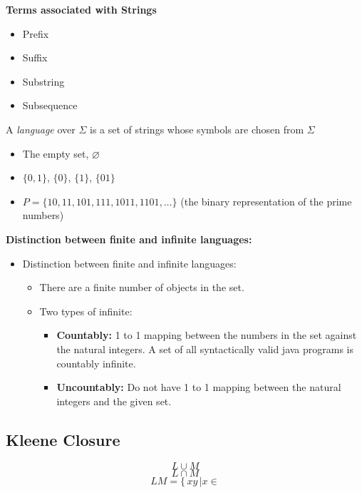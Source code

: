 \documentclass[]{article}
\begin{document}
  \textbf{Terms associated with Strings}
  \begin{itemize}
    \item Prefix
    \item Suffix
    \item Substring
    \item Subsequence
  \end{itemize}

  A \emph{language} over $\Sigma$ is a set of strings whose symbols are chosen 
  from $\Sigma$
  \begin{example}
    \begin{itemize}
      \item The empty set, $\varnothing$
      \item $\{ 0, 1 \}$, $\{0\}$, $\{1\}$, $\{01\}$
      \item $P = \{ 10, 11, 101, 111, 1011, 1101, \ldots \}$ (the binary 
      representation of the prime numbers)
    \end{itemize}
  \end{example}

  \textbf{Distinction between finite and infinite languages:}
    \begin{itemize}
      \item Distinction between finite and infinite languages:
      \begin{itemize}
        \item There are a finite number of objects in the set.
        \item Two types of infinite:
        \begin{itemize}
          \item \textbf{Countably:} 1 to 1 mapping between the numbers in the 
          set against the natural integers. A set of all syntactically valid 
          java programs is countably infinite.
          \item \textbf{Uncountably:} Do not have 1 to 1 mapping between the 
          natural integers and the given set.
        \end{itemize}
      \end{itemize}
    \end{itemize}

  \subsection{Kleene Closure}
    \[ L \cup M \] 
    \[ L \cap M \]
    \[ LM = \{ \, xy \, | x \in \]
\end{document}
